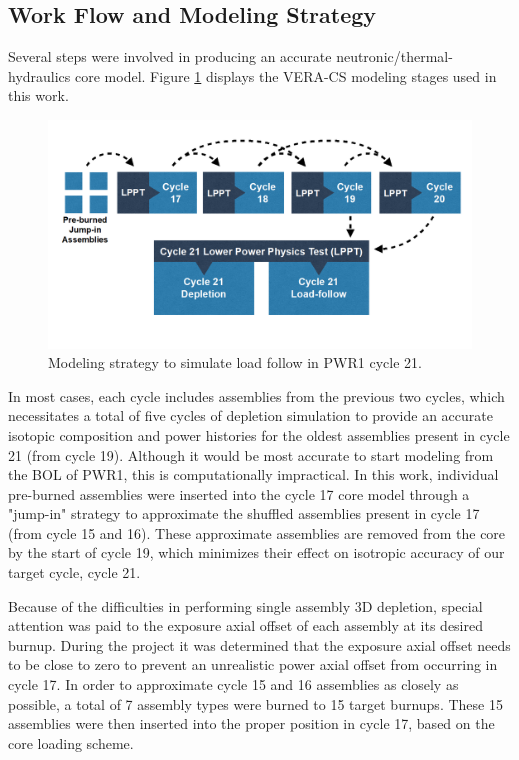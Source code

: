 \documentclass[edeposit,fullpage,11pt]{uiucthesis2009}
\begin{document}
\subsection{Work Flow and Modeling Strategy}

Several steps were involved in producing an accurate neutronic/thermal-hydraulics core model. 
Figure \ref{fig:method} displays the VERA-CS modeling stages used in this work.


\begin{figure}
\begin{center}
\includegraphics[width=0.5\linewidth]{./Figures/method.png}
\end{center}
\caption{Modeling strategy to simulate load follow in PWR1 cycle 21.}
\label{fig:method}
\end{figure} 

In most cases, each cycle includes assemblies from the previous two cycles, which necessitates a total of five cycles of depletion simulation to provide an accurate isotopic composition and power histories for the oldest assemblies present in cycle 21 (from cycle 19). 
Although it would be most accurate to start modeling from the \gls{BOL} of PWR1, this is computationally impractical. 
In this work, individual pre-burned assemblies were inserted into the cycle 17 core model through a "jump-in" strategy to approximate the shuffled assemblies present in cycle 17 (from cycle 15 and 16). 
These approximate assemblies are removed from the core by the start of cycle 19, which minimizes their effect on isotropic accuracy of our target cycle, cycle 21. 

Because of the difficulties in performing single assembly 3D depletion, special attention was paid to the exposure axial offset of each assembly at its desired burnup. 
During the project it was determined that the exposure axial offset needs to be close to zero to prevent an unrealistic power axial offset from occurring in cycle 17. 
In order to approximate cycle 15 and 16 assemblies as closely as possible, a total of 7 assembly types were burned to 15 target burnups. 
These 15 assemblies were then inserted into the proper position in cycle 17, based on the core loading scheme.
\end{document}

